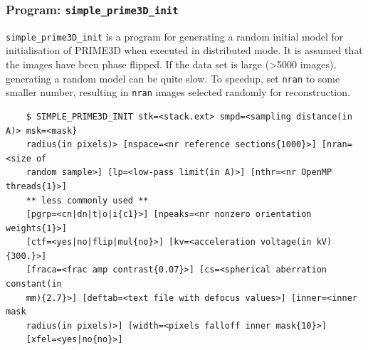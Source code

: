 \documentclass[a4paper,11pt]{article}
\newcommand{\prgname}[1]{\textcolor{NavyBlue}{\texttt{#1}}}
\begin{document}
\subsubsection{Program: \prgname{simple\_prime3D\_init}}
\label{prime3D_init}
\prgname{simple\_prime3D\_init} is a program for generating a random initial model for initialisation of PRIME3D when executed in distributed mode. It is assumed that the images have been phase flipped. If the data set is large (>5000 images), generating a random model can be quite slow. To speedup, set \texttt{nran} to some smaller number, resulting in \texttt{nran} images selected randomly for reconstruction.
\begin{verbatim}
    $ SIMPLE_PRIME3D_INIT stk=<stack.ext> smpd=<sampling distance(in A)> msk=<mask}
    radius(in pixels)> [nspace=<nr reference sections{1000}>] [nran=<size of
    random sample>] [lp=<low-pass limit(in A)>] [nthr=<nr OpenMP threads{1}>]
    ** less commonly used **
    [pgrp=<cn|dn|t|o|i{c1}>] [npeaks=<nr nonzero orientation weights{1}>]
    [ctf=<yes|no|flip|mul{no}>] [kv=<acceleration voltage(in kV){300.}>]
    [fraca=<frac amp contrast{0.07}>] [cs=<spherical aberration constant(in
    mm){2.7}>] [deftab=<text file with defocus values>] [inner=<inner mask
    radius(in pixels)>] [width=<pixels falloff inner mask{10}>]
    [xfel=<yes|no{no}>]
\end{verbatim}
\end{document}
